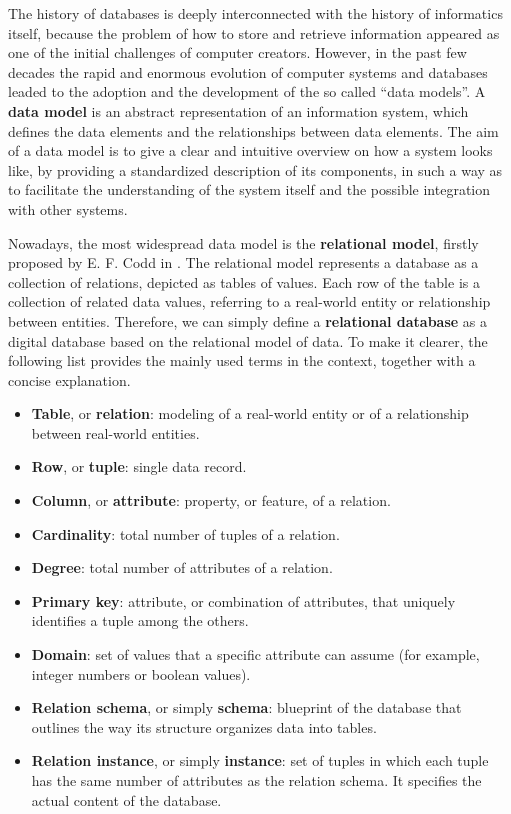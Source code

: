 The history of databases is deeply interconnected with the history of informatics itself, because the problem of how to store and retrieve information appeared as one of the initial challenges of computer creators. However, in the past few decades the rapid and enormous evolution of computer systems and databases leaded to the adoption and the development of the so called ``data models''. A \textbf{data model} is an abstract representation of an information system, which defines the data elements and the relationships between data elements. The aim of a data model is to give a clear and intuitive overview on how a system looks like, by providing a standardized description of its components, in such a way as to facilitate the understanding of the system itself and the possible integration with other systems.

Nowadays, the most widespread data model is the \textbf{relational model}, firstly proposed by E. F. Codd in \cite{codd1970relational}. The relational model represents a database as a collection of relations, depicted as tables of values. Each row of the table is a collection of related data values, referring to a real-world entity or relationship between entities. Therefore, we can simply define a \textbf{relational database} as a digital database based on the relational model of data.
To make it clearer, the following list provides the mainly used terms in the context, together with a concise explanation.
\begin{itemize}
\item \textbf{Table}, or \textbf{relation}: modeling of a real-world entity or of a relationship between real-world entities.
\item \textbf{Row}, or \textbf{tuple}: single data record.
\item \textbf{Column}, or \textbf{attribute}: property, or feature, of a relation.
\item \textbf{Cardinality}: total number of tuples of a relation.
\item \textbf{Degree}: total number of attributes of a relation.
\item \textbf{Primary key}: attribute, or combination of attributes, that uniquely identifies a tuple among the others.
\item \textbf{Domain}: set of values that a specific attribute can assume (for example, integer numbers or boolean values).
\item \textbf{Relation schema}, or simply \textbf{schema}: blueprint of the database that outlines the way its structure organizes data into tables.
\item \textbf{Relation instance}, or simply \textbf{instance}: set of tuples in which each tuple has the same number of attributes as the relation schema. It specifies the actual content of the database.
\end{itemize} 

